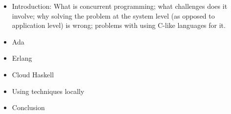 \documentclass[10pt,a4paper]{article}
\begin{document}
\begin{itemize}
    \item Introduction: What is concurrent programming; what challenges does it involve; why solving the problem at the system level (as opposed to application level) is wrong; problems with using C-like languages for it.

    \item Ada

    \item Erlang

    \item Cloud Haskell

    \item Using techniques locally

    \item Conclusion
\end{itemize}

\cite{1}\cite{2}\cite{3}\cite{4}\cite{5}\cite{6}\cite{7}\cite{8}\cite{9}\cite{10}

\small



\end{document}

